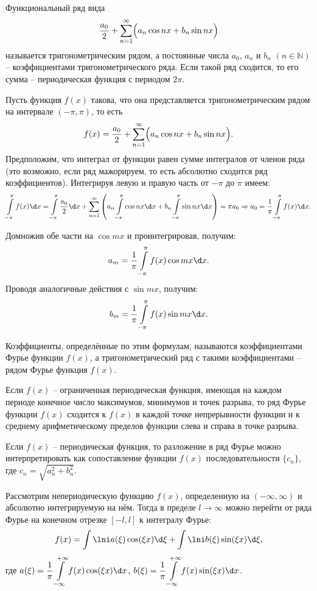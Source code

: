 
Функциональный ряд вида
\[
    \frac{a_0}{2} + \sum\limits_{n=1}^\infty \Bigl(a_n\cos nx + b_n\sin nx\Bigr)
\]
называется тригонометрическим рядом, а постоянные числа \( a_0 \), \( a_n \) и
\( b_n \) \( (n \in \mathbb{N}) \) -- коэффициентами тригонометрического ряда.
Если такой ряд сходится, то его сумма -- периодическая функция с периодом
\( 2\pi \).

Пусть функция \( f(x) \) такова, что она представляется тригонометрическим рядом
на интервале \( (-\pi, \pi) \), то есть
\[
    f(x) = \frac{a_0}{2} + \sum\limits_{n=1}^\infty \Bigl(a_n\cos nx +
    b_n\sin nx\Bigr).
\]
Предположим, что интеграл от функции равен сумме интегралов от членов ряда
(это возможно, если ряд мажорируем, то есть абсолютно сходится ряд
коэффициентов). Интегрируя левую и правую часть от \( -\pi \) до \( \pi \)
имеем:
\[
    \int\limits_{-\pi}^\pi f(x)\d x = \int\limits_{-\pi}^\pi \frac{a_0}{2}\d x +
    \sum\limits_{n=1}^\infty \left(a_n\int\limits_{-\pi}^\pi \cos nx\d x + b_n
    \int\limits_{-\pi}^\pi \sin nx\d x\right) = \pi a_0 \Rightarrow
    a_0 = \frac{1}{\pi}\int\limits_{-\pi}^\pi f(x) \d x.
\]

Домножив обе части на \( \cos mx \) и проинтегрировав, получим:
\[
    a_m = \frac{1}{\pi} \int\limits_{-\pi}^\pi f(x)\cos mx\d x.
\]
Проводя аналогичные действия с \( \sin mx \), получим:
\[
    b_m = \frac{1}{\pi} \int\limits_{-\pi}^\pi f(x)\sin mx \d x.
\]

Коэффициенты, определённые по этим формулам, называются коэффициентами Фурье
функции \( f(x) \), а тригонометрический ряд с такими коэффициентами -- рядом
Фурье функция \( f(x) \).

Если \( f(x) \) -- ограниченная периодическая функция, имеющая на каждом периоде
конечное число максимумов, минимумов и точек разрыва, то ряд Фурье функции
\( f(x) \) сходится к \( f(x) \) в каждой точке непрерывности функции и к
среднему арифметическому пределов функции слева и справа в точке разрыва.

Если \( f(x) \) -- периодическая функция, то разложение в ряд Фурье можно
интерпретировать как сопоставление функции \( f(x) \) последовательности
\( \{c_n\} \), где \( c_n = \sqrt{a_n^2 + b_n^2} \).

Рассмотрим непериодическую функцию \( f(x) \), определенную на \( (-\infty,
\infty) \) и абсолютно интегрируемую на нём. Тогда в пределе \( l \to \infty \)
можно перейти от ряда Фурье на конечном отрезке \( [-l, l] \) к интегралу Фурье:
\[
    f(x) = \int\lni a(\xi)\cos(\xi x)\d\xi + \int\lni b(\xi)\sin(\xi x)\d\xi,
\]
где \( \ds a(\xi) = \frac{1}{\pi} \int\limits_{-\infty}^{+\infty}
f(x)\cos(\xi x)\d x \), \( \ds b(\xi) = \frac{1}{\pi}
\int\limits_{-\infty}^{+\infty} f(x)\sin(\xi x)\d x \).

